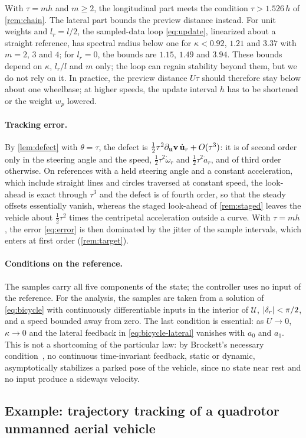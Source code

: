 \begin{remark}\label{rem:bicycle-speed}
With $\tau = mh$ and $m \ge 2$, the longitudinal part meets the condition $\tau > 1.526\,h$ of
\cref{rem:chain}.
The lateral part bounds the preview distance instead.
For unit weights and $l_r = l/2$, the sampled-data loop \eqref{eq:update}, linearized about a straight
reference, has spectral radius below one for $\kappa < 0.92$, $1.21$ and $3.37$ with $m = 2$, $3$ and
$4$; for $l_r = 0$, the bounds are $1.15$, $1.49$ and $3.94$.
These bounds depend on $\kappa$, $l_r/l$ and $m$ only; the loop can regain stability beyond them, but
we do not rely on it.
In practice, the preview distance $U\tau$ should therefore stay below about one wheelbase; at higher
speeds, the update interval $h$ has to be shortened or the weight $w_p$ lowered.
\end{remark}

\paragraph{Tracking error.}
By \cref{lem:defect} with $\theta = \tau$, the defect is
$\frac12\tau^2\partial_{\mathbf{u}}\mathbf{v}\,\dot{\mathbf{u}}_r + O(\tau^3)$: it is of second order only in the steering
angle and the speed, $\frac12\tau^2\dot\omega_r$ and $\frac12\tau^2\dot a_r$, and of third order
otherwise.
On references with a held steering angle and a constant acceleration, which include straight lines and
circles traversed at constant speed, the look-ahead is exact through $\tau^3$ and the defect is of
fourth order, so that the steady offsets essentially vanish, whereas the staged look-ahead of
\cref{rem:staged} leaves the vehicle about $\frac12\tau^2$ times the centripetal acceleration outside
a curve.
With $\tau = mh$, the error \eqref{eq:error} is then dominated by the jitter of the sample intervals,
which enters at first order (\cref{rem:target}).

\paragraph{Conditions on the reference.}
The samples carry all five components of the state; the controller uses no input of the reference.
For the analysis, the samples are taken from a solution of \eqref{eq:bicycle} with continuously
differentiable inputs in the interior of $\mathcal{U}$, $\lvert\delta_r\rvert < \pi/2$, and a speed bounded
away from zero.
The last condition is essential: as $U \to 0$, $\kappa \to 0$ and the lateral feedback in
\eqref{eq:bicycle-lateral} vanishes with $a_0$ and $a_1$.
This is not a shortcoming of the particular law: by Brockett's necessary
condition~\citep{brockett1983asymptotic}, no continuous time-invariant feedback, static or dynamic,
asymptotically stabilizes a parked pose of the vehicle, since no state near rest and no input
produce a sideways velocity.

\subsection{Example: trajectory tracking of a quadrotor unmanned aerial vehicle}
\label{sec:example-quadrotor}

